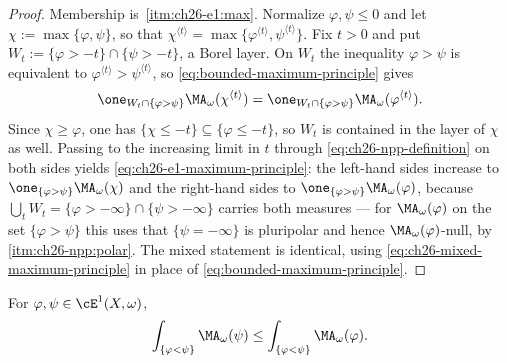 \begin{proof}
Membership is \,\cref{itm:ch26-e1:max}.
Normalize $\varphi,\psi\leq0$ and let $\chi:=\max\{\varphi,\psi\}$, so
that $\chi^{\langle t\rangle}=\max\{\varphi^{\langle
t\rangle},\psi^{\langle t\rangle}\}$.  Fix $t>0$ and put
$W_t:=\{\varphi>-t\}\cap\{\psi>-t\}$, a Borel layer.  On $W_t$ the
inequality $\varphi>\psi$ is equivalent to
$\varphi^{\langle t\rangle}>\psi^{\langle t\rangle}$, so
\eqref{eq:bounded-maximum-principle} gives
\[
 \one_{W_t\cap\{\varphi>\psi\}}\MA_\omega(\chi^{\langle t\rangle})
 =\one_{W_t\cap\{\varphi>\psi\}}\MA_\omega(\varphi^{\langle t\rangle}).
\]
Since $\chi\geq\varphi$, one has $\{\chi\leq-t\}\subseteq\{\varphi\leq
-t\}$, so $W_t$ is contained in the layer of $\chi$ as well.  Passing to
the increasing limit in $t$ through \eqref{eq:ch26-npp-definition} on both
sides yields \eqref{eq:ch26-e1-maximum-principle}: the left-hand sides
increase to $\one_{\{\varphi>\psi\}}\MA_\omega(\chi)$ and the right-hand
sides to $\one_{\{\varphi>\psi\}}\MA_\omega(\varphi)$, because
$\bigcup_tW_t=\{\varphi>-\infty\}\cap\{\psi>-\infty\}$ carries both
measures --- for $\MA_\omega(\varphi)$ on the set $\{\varphi>\psi\}$ this
uses that $\{\psi=-\infty\}$ is pluripolar and hence
$\MA_\omega(\varphi)$-null, by
\,\cref{itm:ch26-npp:polar}.  The mixed statement is
identical, using \eqref{eq:ch26-mixed-maximum-principle} in place of
\eqref{eq:bounded-maximum-principle}.
\end{proof}

\begin{corollary}
\label{cor:ch26-e1-comparison}
For $\varphi,\psi\in\cE^1(X,\omega)$,
\begin{equation}
\label{eq:ch26-e1-comparison}
 \int_{\{\varphi<\psi\}}\MA_\omega(\psi)
 \leq\int_{\{\varphi<\psi\}}\MA_\omega(\varphi).
\end{equation}
\end{corollary}

